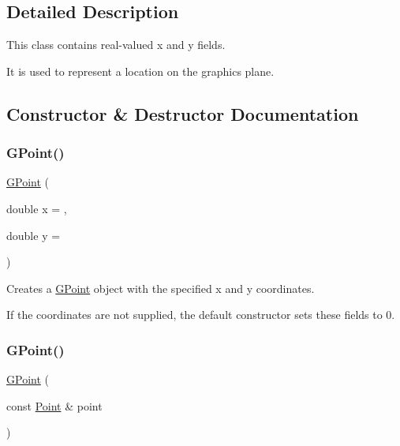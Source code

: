 \subsection{Detailed Description}
This class contains real-\/valued x and y fields. 

It is used to represent a location on the graphics plane. 

\subsection{Constructor \& Destructor Documentation}
\mbox{\label{classGPoint_a8c6ed804b0b13bce303a77ff4fbb64b1}} 
\subsubsection{\texorpdfstring{G\+Point()}{GPoint()}\hspace{0.1cm}{\footnotesize\ttfamily [1/2]}}
{\footnotesize\ttfamily \mbox{\hyperlink{classGPoint}{G\+Point}} (\begin{DoxyParamCaption}\item[{double}]{x = {},  }\item[{double}]{y = {} }\end{DoxyParamCaption})}



Creates a {\ttfamily \mbox{\hyperlink{classGPoint}{G\+Point}}} object with the specified {\ttfamily x} and {\ttfamily y} coordinates. 

If the coordinates are not supplied, the default constructor sets these fields to 0. \mbox{\label{classGPoint_add4732bf649d02caab4d24487e0f5caa}} 
\subsubsection{\texorpdfstring{G\+Point()}{GPoint()}\hspace{0.1cm}{\footnotesize\ttfamily [2/2]}}
{\footnotesize\ttfamily \mbox{\hyperlink{classGPoint}{G\+Point}} (\begin{DoxyParamCaption}\item[{const \mbox{\hyperlink{classPoint}{Point}} \&}]{point }\end{DoxyParamCaption})}



